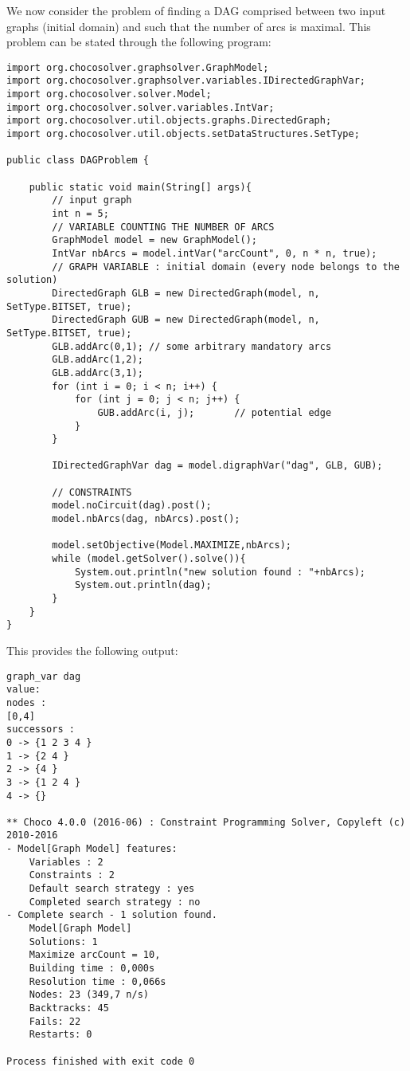 \documentclass{article}
\begin{document}
We now consider the problem of finding a DAG comprised between two input graphs (initial domain) and such that the number of arcs is maximal. 
This problem can be stated through the following program:
\begin{lstlisting}
import org.chocosolver.graphsolver.GraphModel;
import org.chocosolver.graphsolver.variables.IDirectedGraphVar;
import org.chocosolver.solver.Model;
import org.chocosolver.solver.variables.IntVar;
import org.chocosolver.util.objects.graphs.DirectedGraph;
import org.chocosolver.util.objects.setDataStructures.SetType;

public class DAGProblem {

	public static void main(String[] args){
		// input graph
		int n = 5;
		// VARIABLE COUNTING THE NUMBER OF ARCS
		GraphModel model = new GraphModel();
		IntVar nbArcs = model.intVar("arcCount", 0, n * n, true);
		// GRAPH VARIABLE : initial domain (every node belongs to the solution)
		DirectedGraph GLB = new DirectedGraph(model, n, SetType.BITSET, true);
		DirectedGraph GUB = new DirectedGraph(model, n, SetType.BITSET, true);
		GLB.addArc(0,1); // some arbitrary mandatory arcs
		GLB.addArc(1,2);
		GLB.addArc(3,1);
		for (int i = 0; i < n; i++) {
			for (int j = 0; j < n; j++) {
				GUB.addArc(i, j);		// potential edge
			}
		}

		IDirectedGraphVar dag = model.digraphVar("dag", GLB, GUB);

		// CONSTRAINTS
		model.noCircuit(dag).post();
		model.nbArcs(dag, nbArcs).post();

		model.setObjective(Model.MAXIMIZE,nbArcs);
		while (model.getSolver().solve()){
			System.out.println("new solution found : "+nbArcs);
			System.out.println(dag);
		}
	}
}
\end{lstlisting}

This provides the following output:

\begin{lstlisting}
graph_var dag
value: 
nodes : 
[0,4]
successors : 
0 -> {1 2 3 4 }
1 -> {2 4 }
2 -> {4 }
3 -> {1 2 4 }
4 -> {}

** Choco 4.0.0 (2016-06) : Constraint Programming Solver, Copyleft (c) 2010-2016
- Model[Graph Model] features:
	Variables : 2
	Constraints : 2
	Default search strategy : yes
	Completed search strategy : no
- Complete search - 1 solution found.
	Model[Graph Model]
	Solutions: 1
	Maximize arcCount = 10,
	Building time : 0,000s
	Resolution time : 0,066s
	Nodes: 23 (349,7 n/s) 
	Backtracks: 45
	Fails: 22
	Restarts: 0

Process finished with exit code 0
\end{lstlisting}
\end{document}
